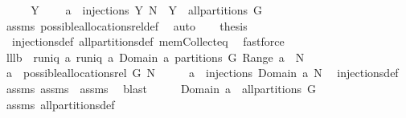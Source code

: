 \begin{isabellebody}
%
\isadelimproof
%
\endisadelimproof
%
\isatagproof
{}\isamarkupfalse%
\ {\isacharminus}\isanewline
\ \ \isamarkupfalse%
\ Y\ \isanewline
\ \ {}{\isacharcolon}\ {\isachardoublequoteopen}a\ {\isasymin}\ injections\ Y\ N\ {\isacharampersand}\ Y\ {\isasymin}\ all{\isacharunderscore}partitions\ G{\isachardoublequoteclose}\ \isamarkupfalse%
\ assms\ possible{\isacharunderscore}allocations{\isacharunderscore}rel{\isacharunderscore}def\ \isamarkupfalse%
\ auto\isanewline
\ \ \isamarkupfalse%
\ {\isacharquery}thesis\ \isamarkupfalse%
\ {}\ injections{\isacharunderscore}def\ all{\isacharunderscore}partitions{\isacharunderscore}def\ mem{\isacharunderscore}Collect{\isacharunderscore}eq\ \isamarkupfalse%
\ fastforce\isanewline
{}\isamarkupfalse%
%
\endisatagproof
{\isafoldproof}%
%
\isadelimproof
\isanewline
%
\endisadelimproof
\isanewline
{}\isamarkupfalse%
\ lll{}{}b{\isacharcolon}\ \ {\isachardoublequoteopen}runiq\ a{\isachardoublequoteclose}\ {\isachardoublequoteopen}runiq\ {\isacharparenleft}a{\isasyminverse}{\isacharparenright}{\isachardoublequoteclose}\ {\isachardoublequoteopen}{\isacharparenleft}Domain\ a{\isacharparenright}\ partitions\ G{\isachardoublequoteclose}\ {\isachardoublequoteopen}Range\ a\ {\isasymsubseteq}\ N{\isachardoublequoteclose}\isanewline
{}\ {\isachardoublequoteopen}a\ {\isasymin}\ possible{\isacharunderscore}allocations{\isacharunderscore}rel\ G\ N{\isachardoublequoteclose}\isanewline
%
\isadelimproof
%
\endisadelimproof
%
\isatagproof
{}\isamarkupfalse%
\ {\isacharminus}\isanewline
\ \ \isamarkupfalse%
\ {\isachardoublequoteopen}a\ {\isasymin}\ injections\ {\isacharparenleft}Domain\ a{\isacharparenright}\ N{\isachardoublequoteclose}\ \isamarkupfalse%
\ injections{\isacharunderscore}def\ \isamarkupfalse%
\ assms{\isacharparenleft}{}{\isacharparenright}\ assms{\isacharparenleft}{}{\isacharparenright}\ \ assms{\isacharparenleft}{}{\isacharparenright}\ \isamarkupfalse%
\ blast\isanewline
\ \ \isamarkupfalse%
\ \isamarkupfalse%
\ {\isachardoublequoteopen}Domain\ a\ {\isasymin}\ all{\isacharunderscore}partitions\ G{\isachardoublequoteclose}\ \isamarkupfalse%
\ assms{\isacharparenleft}{}{\isacharparenright}\ all{\isacharunderscore}partitions{\isacharunderscore}def\ \isamarkupfalse%

\end{isabellebody}
